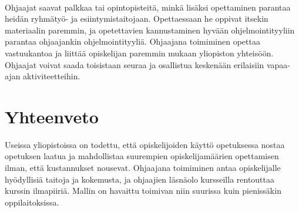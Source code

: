 \documentclass[finnish]{tktltiki2}
\theoremstyle{definition}
\theoremstyle{remark}
\begin{document}
\\
Ohjaajat saavat palkkaa tai opintopisteitä, minkä lisäksi opettaminen parantaa heidän ryhmätyö- ja esiintymistaitojaan. Opettaessaan he oppivat itsekin materiaalin paremmin,\cite{Reges03} ja opetettavien kannustaminen hyvään ohjelmointityyliin parantaa ohjaajankin ohjelmointityyliä.\cite{Roberts95} Ohjaajana toimiminen opettaa vastuukantoa ja liittää opiskelijan paremmin mukaan yliopiston yhteisöön.\cite{Dickson11} Ohjaajat voivat saada toisistaan seuraa ja osallistua keskenään erilaisiin vapaa-ajan aktiviteetteihin.\cite{Roberts95}







\section{Yhteenveto}
Useissa yliopistoissa on todettu, että opiskelijoiden käyttö opetuksessa nostaa opetuksen laatua ja mahdollistaa suurempien opiskelijamäärien opettamisen ilman, että kustannukset nousevat. Ohjaajana toimiminen antaa opiskelijalle hyödyllisiä taitoja ja kokemusta, ja ohjaajien läsnäolo kursseilla rentouttaa kurssin ilmapiiriä. Mallin on havaittu toimivan niin suurissa kuin pienissäkin oppilaitoksissa.




\end{document}

